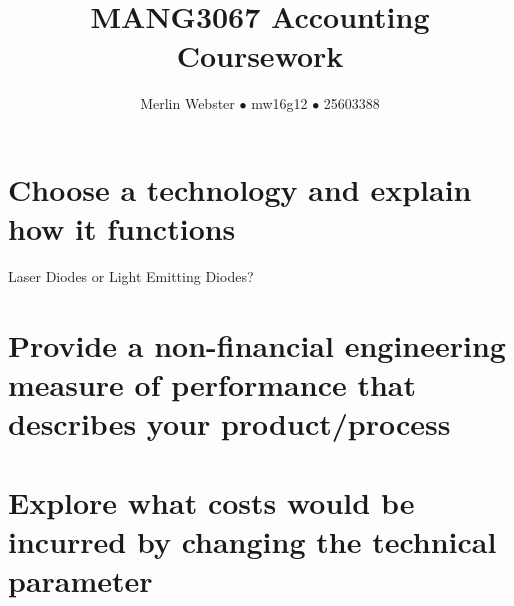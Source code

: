 \documentclass[11pt]{article}
\begin{document}
\title{MANG3067 Accounting Coursework}
\author{Merlin Webster $\bullet$ mw16g12 $\bullet$ 25603388}
\date{}
\maketitle

\section{Choose a technology and explain how it functions}
Laser Diodes or Light Emitting Diodes?

\section{Provide a non-financial engineering measure of performance that describes your product/process}
\section{Explore what costs would be incurred by changing the technical parameter}
\end{document}
